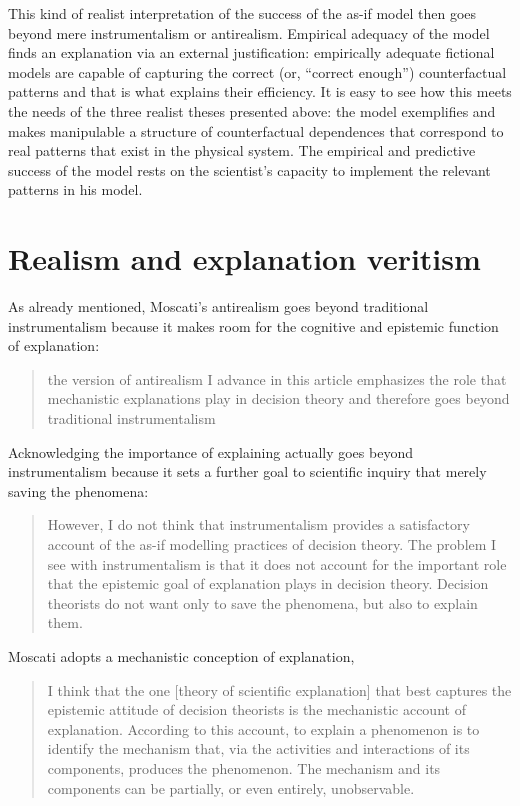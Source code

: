 \documentclass[a4paper,11pt]{article}
\theoremstyle{definition}
\begin{document}
This kind of realist interpretation of the success of the as-if model then goes beyond mere instrumentalism or antirealism. Empirical adequacy of the model finds an explanation via an external justification: empirically adequate fictional models are capable of capturing the correct (or, ``correct enough'') counterfactual patterns and that is what explains their efficiency. It is easy to see how this meets the needs of the three realist theses presented above: the model exemplifies and makes manipulable a structure of counterfactual dependences that correspond to real patterns that exist in the physical system. The empirical and predictive success of the model rests on the scientist's capacity to implement the relevant patterns in his model.

\section{Realism and explanation veritism}
\label{sec:expla}
As already mentioned, Moscati's antirealism goes beyond traditional instrumentalism because it makes room for the cognitive and epistemic function of explanation:

\begin{quote}
    the version of antirealism I advance in this article emphasizes the role that mechanistic explanations play in decision theory and therefore goes beyond traditional instrumentalism \citep[p.~4]{Moscati2023}
\end{quote}

Acknowledging the importance of explaining actually goes beyond instrumentalism because it sets a further goal to scientific inquiry that merely saving the phenomena:

\begin{quote}
    However, I do not think that instrumentalism provides a satisfactory account of the as-if modelling practices of decision theory. The problem I see with instrumentalism is that it does not account for the important role that the epistemic goal of explanation plays in decision theory. Decision theorists do not want only to save the phenomena, but also to explain them. \citep[p.~21]{Moscati2023}
\end{quote}

Moscati adopts a mechanistic conception of explanation,

\begin{quote}
    I think that the one [theory of scientific explanation] that best captures the epistemic attitude of decision theorists is the mechanistic account of explanation. According to this account, to explain a phenomenon is to identify the mechanism that, via the activities and interactions of its components, produces the phenomenon. The mechanism and its components can be partially, or even entirely, unobservable. \citep[p.~21]{Moscati2023}
\end{quote}
\end{document}
